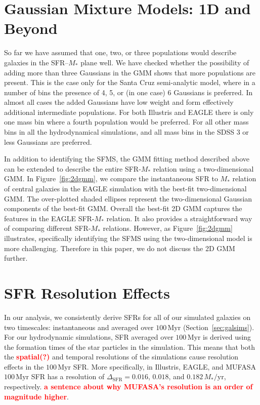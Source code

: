 \documentclass[preprint2,tighten]{aastex62}
\newcommand{\todo}[1]{{\bf \textcolor{red}{ #1}}}
\begin{document}
\section{Gaussian Mixture Models: 1D and Beyond} \label{app:gmm}
So far we have assumed that one, two, or three populations would describe galaxies in the SFR--$M_*$ plane well. We have checked whether the possibility of adding more than three Gaussians in the GMM shows that more populations are present. This is the case only for the Santa Cruz semi-analytic model, where in a number of bins the presence of 4, 5, or (in one case) 6 Gaussians is preferred. In almost all cases the added Gaussians have low weight and form effectively additional intermediate populations. For both Illustris and EAGLE there is only one mass bin where a fourth population would be preferred. For all other mass bins in all the hydrodynamical simulations, and all mass bins in the SDSS 3 or less Gaussians are preferred.


In addition to identifying the SFMS, the GMM fitting method described above can 
be extended to describe the entire SFR-$M_*$ relation using a two-dimensional 
GMM. In Figure~\ref{fig:2dgmm}, we compare the instantaneous SFR to $M_*$ relation 
of central galaxies in the EAGLE simulation with the best-fit two-dimensional GMM. 
The over-plotted shaded ellipses represent the two-dimensional Gaussian components
of the best-fit GMM. Overall the best-fit 2D GMM captures the features in the 
EAGLE SFR-$M_*$ relation. It also provides a straightforward way of comparing 
different SFR-$M_*$ relations. However, as Figure~\ref{fig:2dgmm} illustrates, 
specifically identifying the SFMS using the two-dimensional model is more 
challenging. Therefore in this paper, we do not discuss the 2D GMM further. 

\section{SFR Resolution Effects} \label{app:zerosfr}
In our analysis, we consistently derive SFRs for all of our simulated
galaxies on two timescales: instantaneous and averaged over 
$100\,\mathrm{Myr}$ (Section~\ref{sec:galsims}). For our hydrodynamic 
simulations, SFR averaged over $100\,\mathrm{Myr}$ is derived using 
the formation times of the star particles in the simulation. This means 
that both the \todo{spatial(?)} and temporal resolutions of the 
simulations cause resolution effects in the $100\,\mathrm{Myr}$ SFR. 
More specifically, in Illustris, EAGLE, and MUFASA $100\,\mathrm{Myr}$ 
SFR has a resolution of $\Delta_\mathrm{SFR} = 0.016$, $0.018$, and 
$0.182\,M_*/\mathrm{yr}$, respectively. 
\todo{a sentence about why MUFASA's resolution is an order of magnitude higher}.
\end{document}

